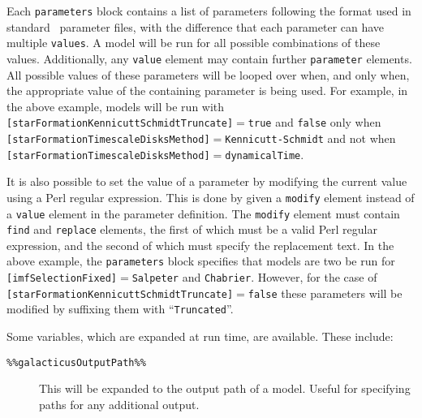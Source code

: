 Each {\tt parameters} block contains a list of parameters following the format used in standard \glc\ parameter files, with the difference that each parameter can have multiple {\tt values}. A model will be run for all possible combinations of these values. Additionally, any {\tt value} element may contain further {\tt parameter} elements. All possible values of these parameters will be looped over when, and only when, the appropriate value of the containing parameter is being used. For example, in the above example, models will be run with {\tt [starFormationKennicuttSchmidtTruncate]}$=${\tt true} and {\tt false} only when {\tt [starFormationTimescaleDisksMethod]}$=${\tt Kennicutt-Schmidt} and not when {\tt [starFormationTimescaleDisksMethod]}$=${\tt dynamicalTime}.

It is also possible to set the value of a parameter by modifying the current value using a Perl regular expression. This is done by given a {\tt modify} element instead of a {\tt value} element in the parameter definition. The {\tt modify} element must contain {\tt find} and {\tt replace} elements, the first of which must be a valid Perl regular expression, and the second of which must specify the replacement text. In the above example, the {\tt parameters} block specifies that models are two be run for {\tt [imfSelectionFixed]}$=${\tt Salpeter} and {\tt Chabrier}. However, for the case of {\tt [starFormationKennicuttSchmidtTruncate]}$=${\tt false} these parameters will be modified by suffixing them with ``{\tt Truncated}''.

Some variables, which are expanded at run time, are available. These include:
\begin{description}
\item [{\tt \%\%galacticusOutputPath\%\%}] This will be expanded to the output path of a model. Useful for specifying paths for any additional output.
\end{description}

